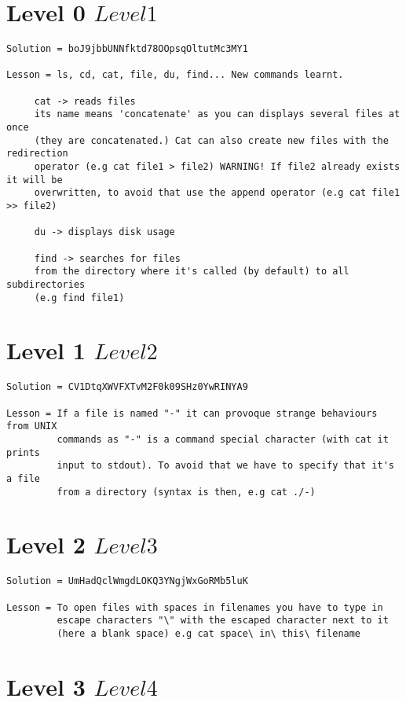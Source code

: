 \documentclass[a4paper]{report}
\begin{document}
	 
\section{Level 0 \rightarrow $ Level 1 $}

\begin{verbatim}
Solution = boJ9jbbUNNfktd78OOpsqOltutMc3MY1

Lesson = ls, cd, cat, file, du, find... New commands learnt. 
	 
	 cat -> reads files
	 its name means 'concatenate' as you can displays several files at once 
	 (they are concatenated.) Cat can also create new files with the redirection 
	 operator (e.g cat file1 > file2) WARNING! If file2 already exists it will be 
	 overwritten, to avoid that use the append operator (e.g cat file1 >> file2)

	 du -> displays disk usage

	 find -> searches for files 
	 from the directory where it's called (by default) to all subdirectories 
	 (e.g find file1)
\end{verbatim}

\newpage
\section{Level 1 \rightarrow $ Level 2 $}

\begin{verbatim}
Solution = CV1DtqXWVFXTvM2F0k09SHz0YwRINYA9

Lesson = If a file is named "-" it can provoque strange behaviours from UNIX 
		 commands as "-" is a command special character (with cat it prints 
		 input to stdout). To avoid that we have to specify that it's a file 
		 from a directory (syntax is then, e.g cat ./-) 
\end{verbatim}


\section{Level 2 \rightarrow $ Level 3 $}

\begin{verbatim}
Solution = UmHadQclWmgdLOKQ3YNgjWxGoRMb5luK

Lesson = To open files with spaces in filenames you have to type in 
		 escape characters "\" with the escaped character next to it 
		 (here a blank space) e.g cat space\ in\ this\ filename
\end{verbatim}


\section{Level 3 \rightarrow $ Level 4 $}
\end{document}
